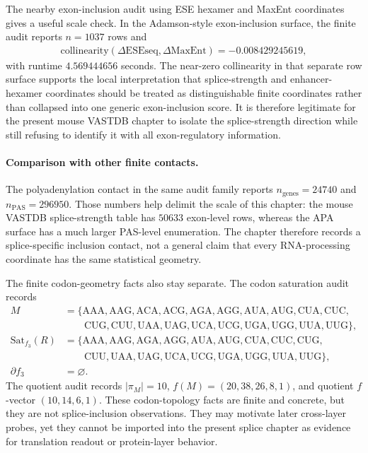 The nearby exon-inclusion audit using ESE hexamer and MaxEnt coordinates gives a useful scale check.  In the Adamson-style exon-inclusion surface, the finite audit reports $n=1037$ rows and
$$
\begin{aligned}
\mathrm{collinearity}(\Delta \mathrm{ESEseq},\Delta \mathrm{MaxEnt})=-0.008429245619,
\end{aligned}
$$
with runtime $4.569444656$ seconds.  The near-zero collinearity in that separate row surface supports the local interpretation that splice-strength and enhancer-hexamer coordinates should be treated as distinguishable finite coordinates rather than collapsed into one generic exon-inclusion score.  It is therefore legitimate for the present mouse VASTDB chapter to isolate the splice-strength direction while still refusing to identify it with all exon-regulatory information.

\paragraph{Comparison with other finite contacts.}
The polyadenylation contact in the same audit family reports $n_{\mathrm{genes}}=24740$ and $n_{\mathrm{PAS}}=296950$.  Those numbers help delimit the scale of this chapter: the mouse VASTDB splice-strength table has $50633$ exon-level rows, whereas the APA surface has a much larger PAS-level enumeration.  The chapter therefore records a splice-specific inclusion contact, not a general claim that every RNA-processing coordinate has the same statistical geometry.

The finite codon-geometry facts also stay separate.  The codon saturation audit records
$$
\begin{aligned}
M &= \{\mathrm{AAA},\mathrm{AAG},\mathrm{ACA},\mathrm{ACG},\mathrm{AGA},\mathrm{AGG},\mathrm{AUA},\mathrm{AUG},\mathrm{CUA},\mathrm{CUC},\\
&\qquad \mathrm{CUG},\mathrm{CUU},\mathrm{UAA},\mathrm{UAG},\mathrm{UCA},\mathrm{UCG},\mathrm{UGA},\mathrm{UGG},\mathrm{UUA},\mathrm{UUG}\},\\
\mathrm{Sat}_{f_3}(R) &= \{\mathrm{AAA},\mathrm{AAG},\mathrm{AGA},\mathrm{AGG},\mathrm{AUA},\mathrm{AUG},\mathrm{CUA},\mathrm{CUC},\mathrm{CUG},\\
&\qquad \mathrm{CUU},\mathrm{UAA},\mathrm{UAG},\mathrm{UCA},\mathrm{UCG},\mathrm{UGA},\mathrm{UGG},\mathrm{UUA},\mathrm{UUG}\},\\
\partial f_3 &= \varnothing.
\end{aligned}
$$
The quotient audit records $|\pi_M|=10$, $f(M)=(20,38,26,8,1)$, and quotient $f$-vector $(10,14,6,1)$.  These codon-topology facts are finite and concrete, but they are not splice-inclusion observations.  They may motivate later cross-layer probes, yet they cannot be imported into the present splice chapter as evidence for translation readout or protein-layer behavior.

